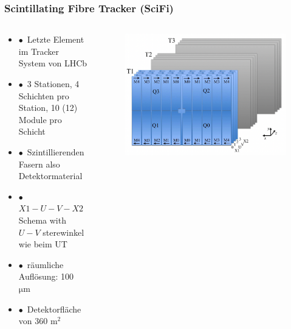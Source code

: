 \documentclass[aspectratio=1610, 12pt, xcolor=dvipsnames]{beamer}
\begin{document}
\begin{frame}\frametitle{Scintillating Fibre Tracker (SciFi)}
  \begin{columns}
    \begin{column}[c]{0.48\textwidth}
      \begin{itemize}
        \item $\bullet$\, Letzte Element im Tracker System von LHCb
        \item $\bullet$\, 3 Stationen, 4 Schichten pro Station, 10 (12) Module pro Schicht
        \item $\bullet$\, Szintillierenden Fasern also Detektormaterial
        \item $\bullet$\, $X1-U-V-X2$ Schema with $U-V$ sterewinkel wie beim UT
        \item $\bullet$\, räumliche Auflösung: 100 $\si{\micro\metre}$
        \item $\bullet$\, Detektorfläche von 360 $\si{\metre\squared}$
      \end{itemize}
    \end{column}
    \begin{column}[c]{0.48\textwidth}
      \begin{figure}
        \centering
        \includegraphics[width=\textwidth]{plots/scifi_layers.png}
      \end{figure}
    \end{column}
  \end{columns}
\end{frame}
\end{document}
